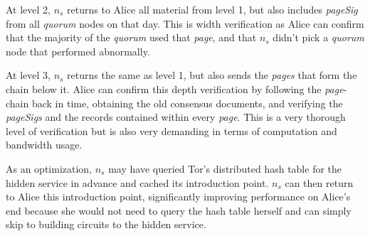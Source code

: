 At level 2, $ n_{s} $ returns to Alice all material from level 1, but also includes \emph{pageSig} from all \emph{quorum} nodes on that day. This is width verification as Alice can confirm that the majority of the \emph{quorum} used that \emph{page}, and that $ n_{s} $ didn't pick a \emph{quorum} node that performed abnormally.

At level 3, $ n_{s} $ returns the same as level 1, but also sends the \emph{pages} that form the chain below it. Alice can confirm this depth verification by following the \emph{page}-chain back in time, obtaining the old consensus documents, and verifying the \emph{pageSigs} and the records contained within every \emph{page}. This is a very thorough level of verification but is also very demanding in terms of computation and bandwidth usage.

As an optimization, $ n_{s} $ may have queried Tor's distributed hash table for the hidden service in advance and cached its introduction point. $ n_{s} $ can then return to Alice this introduction point, significantly improving performance on Alice's end because she would not need to query the hash table herself and can simply skip to building circuits to the hidden service.


